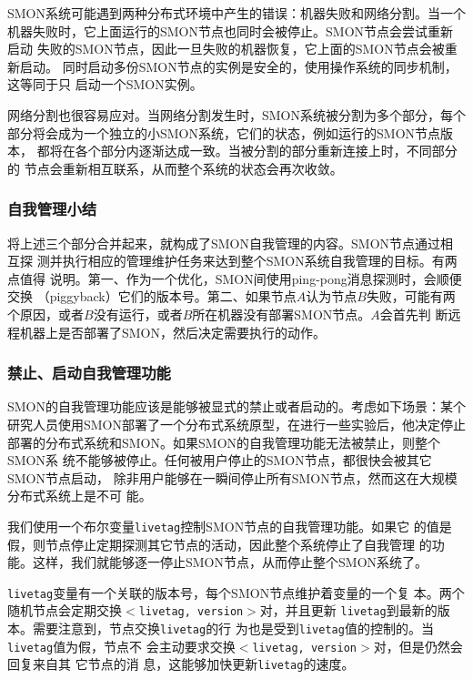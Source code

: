 SMON系统可能遇到两种分布式环境中产生的错误：机器失败和网络分割。当一个
机器失败时，它上面运行的SMON节点也同时会被停止。SMON节点会尝试重新启动
失败的SMON节点，因此一旦失败的机器恢复，它上面的SMON节点会被重新启动。
同时启动多份SMON节点的实例是安全的，使用操作系统的同步机制，这等同于只
启动一个SMON实例。

网络分割也很容易应对。当网络分割发生时，SMON系统被分割为多个部分，每个
部分将会成为一个独立的小SMON系统，它们的状态，例如运行的SMON节点版本，
都将在各个部分内逐渐达成一致。当被分割的部分重新连接上时，不同部分的
节点会重新相互联系，从而整个系统的状态会再次收敛。

\subsubsection*{自我管理小结}

将上述三个部分合并起来，就构成了SMON自我管理的内容。SMON节点通过相互探
测并执行相应的管理维护任务来达到整个SMON系统自我管理的目标。有两点值得
说明。第一、作为一个优化，SMON间使用ping-pong消息探测时，会顺便交换
（piggyback）它们的版本号。第二、如果节点$A$认为节点$B$失败，可能有两
个原因，或者$B$没有运行，或者$B$所在机器没有部署SMON节点。$A$会首先判
断远程机器上是否部署了SMON，然后决定需要执行的动作。

\subsubsection*{禁止、启动自我管理功能}
\label{sec:disablesmon}

SMON的自我管理功能应该是能够被显式的禁止或者启动的。考虑如下场景：某个
研究人员使用SMON部署了一个分布式系统原型，在进行一些实验后，他决定停止
部署的分布式系统和SMON。如果SMON的自我管理功能无法被禁止，则整个SMON系
统不能够被停止。任何被用户停止的SMON节点，都很快会被其它SMON节点启动，
除非用户能够在一瞬间停止所有SMON节点，然而这在大规模分布式系统上是不可
能。

我们使用一个布尔变量\texttt{livetag}控制SMON节点的自我管理功能。如果它
的值是假，则节点停止定期探测其它节点的活动，因此整个系统停止了自我管理
的功能。这样，我们就能够逐一停止SMON节点，从而停止整个SMON系统了。

\texttt{livetag}变量有一个关联的版本号，每个SMON节点维护着变量的一个复
本。两个随机节点会定期交换\texttt{$<$livetag, version$>$}对，并且更新
\texttt{livetag}到最新的版本。需要注意到，节点交换\texttt{livetag}的行
为也是受到\texttt{livetag}值的控制的。当\texttt{livetag}值为假，节点不
会主动要求交换\texttt{$<$livetag, version$>$}对，但是仍然会回复来自其
它节点的消
息，这能够加快更新\texttt{livetag}的速度。

